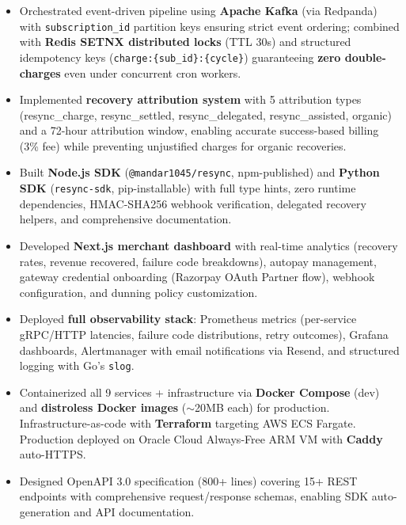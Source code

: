 \documentclass[letterpaper,10pt]{article}
\begin{document}
\begin{itemize}
  \item Orchestrated event-driven pipeline using \textbf{Apache Kafka} (via Redpanda) with \texttt{subscription\_id} partition keys ensuring strict event ordering; combined with \textbf{Redis SETNX distributed locks} (TTL 30s) and structured idempotency keys (\texttt{charge:\{sub\_id\}:\{cycle\}}) guaranteeing \textbf{zero double-charges} even under concurrent cron workers.

  \item Implemented \textbf{recovery attribution system} with 5 attribution types (resync\_charge, resync\_settled, resync\_delegated, resync\_assisted, organic) and a 72-hour attribution window, enabling accurate success-based billing (3\% fee) while preventing unjustified charges for organic recoveries.

  \item Built \textbf{Node.js SDK} (\texttt{@mandar1045/resync}, npm-published) and \textbf{Python SDK} (\texttt{resync-sdk}, pip-installable) with full type hints, zero runtime dependencies, HMAC-SHA256 webhook verification, delegated recovery helpers, and comprehensive documentation.

  \item Developed \textbf{Next.js merchant dashboard} with real-time analytics (recovery rates, revenue recovered, failure code breakdowns), autopay management, gateway credential onboarding (Razorpay OAuth Partner flow), webhook configuration, and dunning policy customization.

  \item Deployed \textbf{full observability stack}: Prometheus metrics (per-service gRPC/HTTP latencies, failure code distributions, retry outcomes), Grafana dashboards, Alertmanager with email notifications via Resend, and structured logging with Go's \texttt{slog}.

  \item Containerized all 9 services + infrastructure via \textbf{Docker Compose} (dev) and \textbf{distroless Docker images} ($\sim$20MB each) for production. Infrastructure-as-code with \textbf{Terraform} targeting AWS ECS Fargate. Production deployed on Oracle Cloud Always-Free ARM VM with \textbf{Caddy} auto-HTTPS.

  \item Designed OpenAPI 3.0 specification (800+ lines) covering 15+ REST endpoints with comprehensive request/response schemas, enabling SDK auto-generation and API documentation.
\end{itemize}
\end{document}
